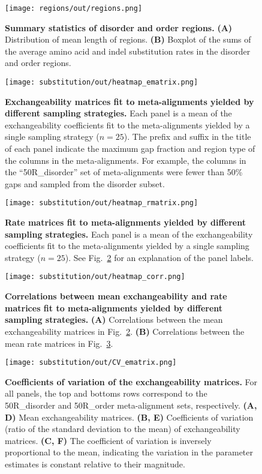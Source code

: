 \begin{figure}[h!]
\texttt{[image: regions/out/regions.png]}
\centering
\caption{\textbf{Summary statistics of disorder and order regions.}
\textbf{(A)} Distribution of mean length of regions. \textbf{(B)} Boxplot of the sums of the average amino acid and indel substitution rates in the disorder and order regions.}
\label{sfig:regions}
\end{figure}

\begin{figure}[h!]
\texttt{[image: substitution/out/heatmap\_ematrix.png]}
\centering
\caption{\textbf{Exchangeability matrices fit to meta-alignments yielded by different sampling strategies.}
Each panel is a mean of the exchangeability coefficients fit to the meta-alignments yielded by a single sampling strategy ($n = 25$). The prefix and suffix in the title of each panel indicate the maximum gap fraction and region type of the columns in the meta-alignments. For example, the columns in the ``50R\_disorder'' set of meta-alignments were fewer than 50\% gaps and sampled from the disorder subset.}
\label{sfig:heatmap_ematrix}
\end{figure}

\begin{figure}[h!]
\texttt{[image: substitution/out/heatmap\_rmatrix.png]}
\centering
\caption{\textbf{Rate matrices fit to meta-alignments yielded by different sampling strategies.}
Each panel is a mean of the exchangeability coefficients fit to the meta-alignments yielded by a single sampling strategy ($n = 25$). See Fig.~\ref{sfig:heatmap_ematrix} for an explanation of the panel labels.}
\label{sfig:heatmap_rmatrix}
\end{figure}

\begin{figure}[h!]
\texttt{[image: substitution/out/heatmap\_corr.png]}
\centering
\caption{\textbf{Correlations between mean exchangeability and rate matrices fit to meta-alignments yielded by different sampling strategies.}
\textbf{(A)} Correlations between the mean exchangeability matrices in Fig.~\ref{sfig:heatmap_ematrix}. \textbf{(B)} Correlations between the mean rate matrices in Fig.~\ref{sfig:heatmap_rmatrix}.}
\label{sfig:heatmap_corr}
\end{figure}

\begin{figure}[h!]
\texttt{[image: substitution/out/CV\_ematrix.png]}
\centering
\caption{\textbf{Coefficients of variation of the exchangeability matrices.}
For all panels, the top and bottoms rows correspond to the 50R\_disorder and 50R\_order meta-alignment sets, respectively. \textbf{(A, D)} Mean exchangeability matrices. \textbf{(B, E)} Coefficients of variation (ratio of the standard deviation to the mean) of exchangeability matrices. \textbf{(C, F)} The coefficient of variation is inversely proportional to the mean, indicating the variation in the parameter estimates is constant relative to their magnitude.}
\label{sfig:CV_ematrix}
\end{figure}


